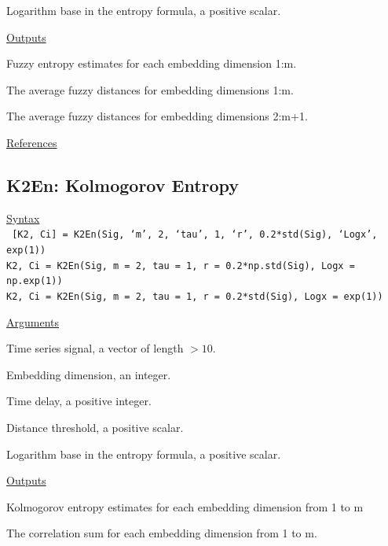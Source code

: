 \documentclass[12pt, a4paper, titlepage, openany]{book}
\begin{document}
\begin{description}[labelsep=1cm, labelwidth=2cm, nosep,style=multiline,leftmargin=3cm]
\item[\texttt{Logx}]	Logarithm base in the entropy formula, a positive scalar.
\end{description}

\noindent \ul{Outputs}
\begin{description}[labelsep=1cm, labelwidth=2cm, nosep]\footnotesize
\item[\texttt{Fuzz}]	Fuzzy entropy estimates for each embedding dimension 1:m.
\item[\texttt{Ps1}]		The average fuzzy distances for embedding dimensions 1:m.
\item[\texttt{Ps2}]		The average fuzzy distances for embedding dimensions 2:m+1.
\end{description}

\noindent \ul{References}\hspace{1cm}
\cite{Fuzz1} \cite{Fuzz2} \cite{Fuzz3}



\newpage
\subsection{\normalsize K2En: \hspace{15mm}  Kolmogorov Entropy} \label{K2En}
\noindent\ul{Syntax} \vspace{6mm} \\ \noindent \texttt{\footnotesize
[K2, Ci] = K2En(Sig, ‘m’, 2, ‘tau’, 1, ‘r’, 0.2*std(Sig), ‘Logx’, exp(1)) \\
K2, Ci  = K2En(Sig, m = 2, tau = 1, r = 0.2*np.std(Sig), Logx = np.exp(1)) \\
K2, Ci  = K2En(Sig, m = 2, tau = 1, r = 0.2*std(Sig), Logx = exp(1))}

\noindent \ul{Arguments}
\begin{description}[labelsep=1cm, labelwidth=2cm, nosep, style=multiline,leftmargin=3cm]\footnotesize
\item[\texttt{Sig}]		Time series signal, a vector of length $> 10$.
\item[\texttt{m}]		Embedding dimension, an integer.
\item[\texttt{tau}]		Time delay, a positive integer.
\item[\texttt{r}]		Distance threshold, a positive scalar.
\item[\texttt{Logx}]	Logarithm base in the entropy formula, a positive scalar.
\end{description}

\noindent \ul{Outputs}
\begin{description}[labelsep=1cm, labelwidth=2cm, nosep, style=multiline,leftmargin=3cm]\footnotesize
\item[\texttt{K2}]		Kolmogorov entropy estimates for each embedding dimension from 1 to m
\item[\texttt{Ci}]		The correlation sum for each embedding dimension from 1 to m.
\end{description}
\end{document}
